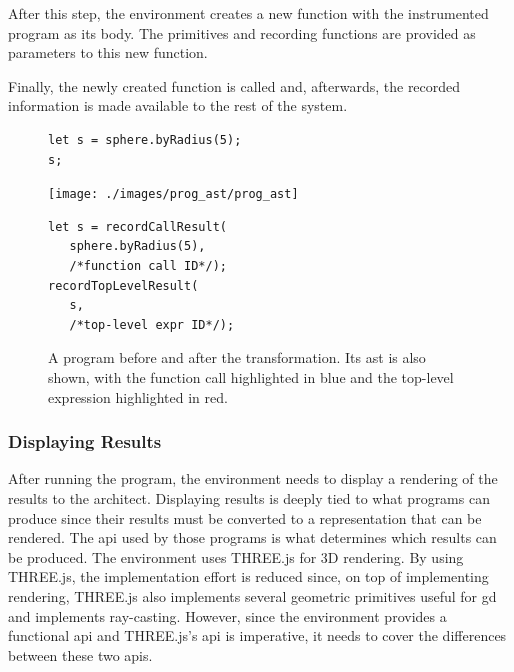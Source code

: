 After this step, the environment creates a new function with the instrumented program as its body.
The primitives and recording functions are provided as parameters to this new function.

Finally, the newly created function is called and, afterwards, the recorded information is made available to the rest of the system.

\begin{figure}
  \centering
\begin{minipage}[c]{0.3\linewidth}
  \begin{verbatim}
let s = sphere.byRadius(5);
s;
  \end{verbatim}
\end{minipage}%
\hspace{0.045\linewidth}%
\begin{minipage}[c]{0.3\linewidth}
  \texttt{[image: ./images/prog\_ast/prog\_ast]}
\end{minipage}%
\hspace{0.045\linewidth}%
\begin{minipage}[c]{0.3\linewidth}
  \begin{verbatim}
let s = recordCallResult(
   sphere.byRadius(5),
   /*function call ID*/);
recordTopLevelResult(
   s,
   /*top-level expr ID*/);
  \end{verbatim}
\end{minipage}
  \caption[A program before and after the transformation.]{A program before and after the transformation. Its \gls{ast} is also shown, with the function call highlighted in blue and the top-level expression highlighted in red.}
  \label{fig:instrument:example}
\end{figure}


\subsubsection{Displaying Results}
After running the program, the environment needs to display a rendering of the results to the architect.
Displaying results is deeply tied to what programs can produce since their results must be converted to a representation that can be rendered.
The \gls{api} used by those programs is what determines which results can be produced.
The environment uses THREE.js for 3D rendering.
By using THREE.js, the implementation effort is reduced since, on top of implementing rendering, THREE.js also implements several geometric primitives useful for \gls{gd} and implements ray-casting.
However, since the environment provides a functional \gls{api} and THREE.js's \gls{api} is imperative, it needs to cover the differences between these two \glspl{api}.

